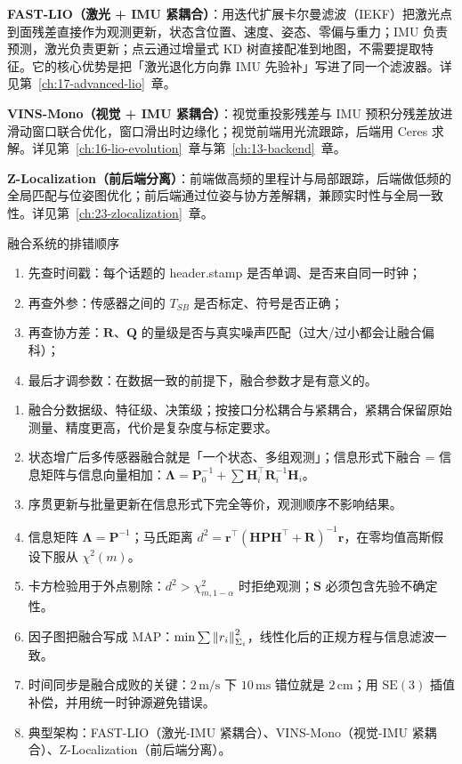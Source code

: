 \textbf{FAST-LIO（激光 + IMU 紧耦合）}\cite{xu2022fastlio2}：用迭代扩展卡尔曼滤波（IEKF）把激光点到面残差直接作为观测更新，状态含位置、速度、姿态、零偏与重力；IMU 负责预测，激光负责更新；点云通过增量式 KD 树直接配准到地图，不需要提取特征。它的核心优势是把「激光退化方向靠 IMU 先验补」写进了同一个滤波器。详见第~\ref{ch:17-advanced-lio}~章。

\textbf{VINS-Mono（视觉 + IMU 紧耦合）}\cite{qin2018vinsmono}：视觉重投影残差与 IMU 预积分残差放进滑动窗口联合优化，窗口滑出时边缘化；视觉前端用光流跟踪，后端用 Ceres 求解。详见第~\ref{ch:16-lio-evolution}~章与第~\ref{ch:13-backend}~章。

\textbf{Z-Localization（前后端分离）}\cite{zloc2026}：前端做高频的里程计与局部跟踪，后端做低频的全局匹配与位姿图优化；前后端通过位姿与协方差解耦，兼顾实时性与全局一致性。详见第~\ref{ch:23-zlocalization}~章。

\begin{keybox}{融合系统的排错顺序}
\begin{enumerate}
  \item 先查时间戳：每个话题的 header.stamp 是否单调、是否来自同一时钟；
  \item 再查外参：传感器之间的 $T_{SB}$ 是否标定、符号是否正确；
  \item 再查协方差：$\bm{R}$、$\bm{Q}$ 的量级是否与真实噪声匹配（过大/过小都会让融合偏科）；
  \item 最后才调参数：在数据一致的前提下，融合参数才是有意义的。
\end{enumerate}
\end{keybox}

\begin{summary}

\begin{enumerate}
  \item 融合分数据级、特征级、决策级；按接口分松耦合与紧耦合，紧耦合保留原始测量、精度更高，代价是复杂度与标定要求。
  \item 状态增广后多传感器融合就是「一个状态、多组观测」；信息形式下融合 = 信息矩阵与信息向量相加：$\bm{\Lambda}=\bm{P}_0^{-1}+\sum\bm{H}_i^{\top}\bm{R}_i^{-1}\bm{H}_i$。
  \item 序贯更新与批量更新在信息形式下完全等价，观测顺序不影响结果。
  \item 信息矩阵 $\bm{\Lambda}=\bm{P}^{-1}$；马氏距离 $d^{2}=\bm{r}^{\top}(\bm{H}\bm{P}\bm{H}^{\top}+\bm{R})^{-1}\bm{r}$，在零均值高斯假设下服从 $\chi^{2}(m)$。
  \item 卡方检验用于外点剔除：$d^{2}>\chi^{2}_{m,1-\alpha}$ 时拒绝观测；$\bm{S}$ 必须包含先验不确定性。
  \item 因子图把融合写成 MAP：$\min\sum\left\lVert r_i \right\rVert^{2}_{\Sigma_i}$，线性化后的正规方程与信息滤波一致。
  \item 时间同步是融合成败的关键：$2\,\mathrm{m/s}$ 下 $10\,\mathrm{ms}$ 错位就是 $2\,\mathrm{cm}$；用 $\mathrm{SE}(3)$ 插值补偿，并用统一时钟源避免错误。
  \item 典型架构：FAST-LIO（激光-IMU 紧耦合）、VINS-Mono（视觉-IMU 紧耦合）、Z-Localization（前后端分离）。
\end{enumerate}


\end{summary}

